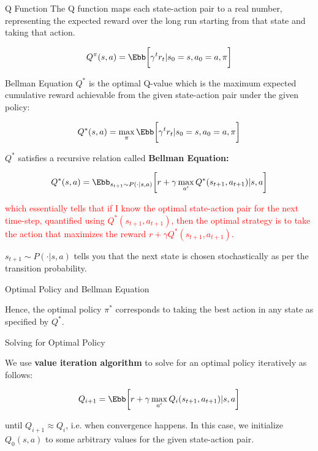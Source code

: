 \documentclass[aspectratio=169,xcolor=dvipsnames,svgnames,x11names,fleqn]{beamer}
\begin{document}

\begin{frame}{Q Function}
The Q function maps each state-action pair to a real number, representing the expected reward over the long run starting from that state and taking that action.

$$
Q  ^\pi (s, a) = \Ebb\bigg[ \gamma^t r_t | s_0 = s, a_0 = a, \pi  \bigg]
$$
    
\end{frame}



\begin{frame}{Bellman Equation}
    \small
$Q^*$ is the optimal Q-value which is the maximum expected cumulative reward achievable from the given state-action pair under the given policy:

$$
Q^*(s, a) = \max_\pi  \Ebb\bigg[ \gamma^t r_t | s_0 = s, a_0 = a, \pi  \bigg]
$$

$Q^*$ satisfies a recursive relation called \textbf{Bellman Equation:}

$$
Q^*(s, a) = \Ebb_{s_{t+1}\sim P(\cdot | s,a) } \bigg[ r 
    + \gamma \max_{a'} Q^*(s_{t+1}, a_{t+1}) | s, a\bigg]
$$

{\textcolor{red}{which essentially tells that if I know the optimal state-action pair for the next time-step, quantified using $Q^*(s_{t+1}, a_{t+1})$, then the optimal strategy is to take the action that maximizes the reward $r + \gamma Q^*(s_{t+1}, a_{t+1}) $. 
}}

$s_{t+1}\sim P(\cdot | s, a) $ tells you that the next state is chosen stochastically as per the transition probability.
\end{frame}



\begin{frame}{Optimal Policy and Bellman Equation}
    \begin{center}
    \LARGE
        Hence, the optimal policy $\pi^*$ corresponds to taking the best action in any state as specified by $Q^*$.
    \end{center}
\end{frame}



\begin{frame}{Solving for Optimal Policy}

We use \textbf{value iteration algorithm} to solve for an optimal policy iteratively as follows:

$$
Q_{i+1} = \Ebb \bigg[ r + \gamma \max_{a'} Q_i(s_{t+1}, a_{t+1}) | s, a\bigg]
$$

until $Q_{i+1} \approx Q_{i}$, i.e. when convergence happens. In this case, we initialize $Q_0(s, a)$ to some arbitrary values for the given state-action pair.

\end{frame}
\end{document}

